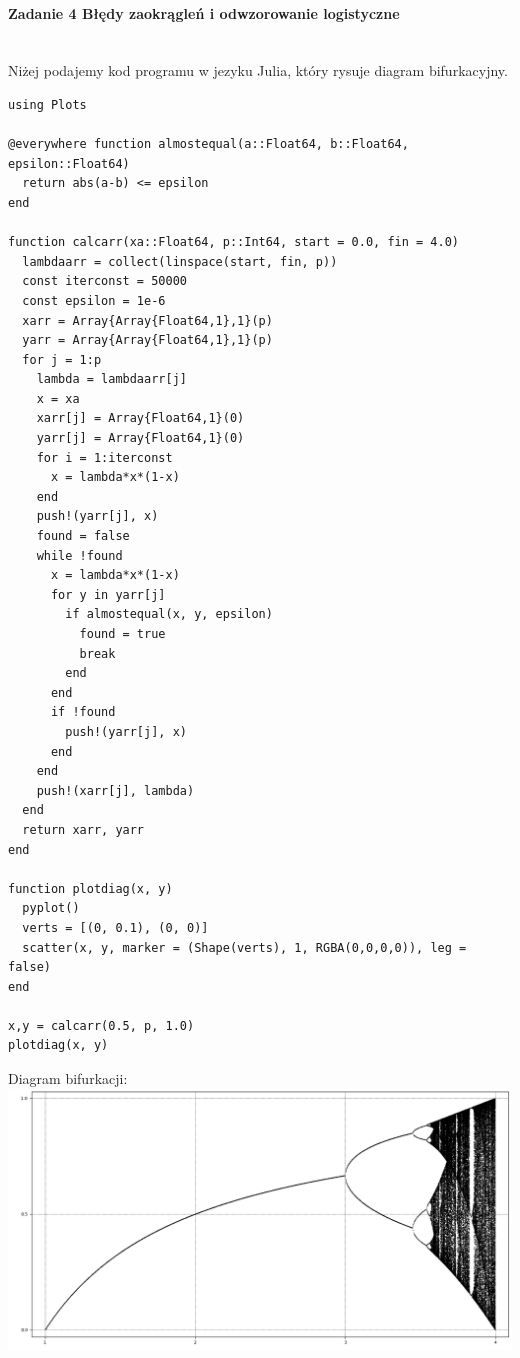\documentclass[12pt,a4paper]{article}
\begin{document}
  \paragraph{Zadanie 4 Błędy zaokrągleń i odwzorowanie logistyczne}\mbox{}\vspace{3mm}\\
  Niżej podajemy kod programu w jezyku Julia, który rysuje diagram bifurkacyjny.
  \begin{Verbatim}
using Plots

@everywhere function almostequal(a::Float64, b::Float64, epsilon::Float64)
  return abs(a-b) <= epsilon
end

function calcarr(xa::Float64, p::Int64, start = 0.0, fin = 4.0)
  lambdaarr = collect(linspace(start, fin, p))
  const iterconst = 50000
  const epsilon = 1e-6
  xarr = Array{Array{Float64,1},1}(p)
  yarr = Array{Array{Float64,1},1}(p)
  for j = 1:p
    lambda = lambdaarr[j]
    x = xa
    xarr[j] = Array{Float64,1}(0)
    yarr[j] = Array{Float64,1}(0)
    for i = 1:iterconst
      x = lambda*x*(1-x)
    end
    push!(yarr[j], x)
    found = false
    while !found
      x = lambda*x*(1-x)
      for y in yarr[j]
        if almostequal(x, y, epsilon)
          found = true
          break
        end
      end
      if !found
        push!(yarr[j], x)
      end
    end
    push!(xarr[j], lambda)
  end
  return xarr, yarr
end

function plotdiag(x, y)
  pyplot()
  verts = [(0, 0.1), (0, 0)]
  scatter(x, y, marker = (Shape(verts), 1, RGBA(0,0,0,0)), leg = false)
end

x,y = calcarr(0.5, p, 1.0)
plotdiag(x, y)
  \end{Verbatim}
  Diagram bifurkacji:
  \newline
  \includegraphics[width=1\textwidth]{img/Figure_1} \newline
\end{document}
